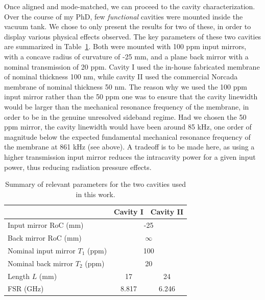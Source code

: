 Once aligned and mode-matched, we can proceed to the cavity characterization. Over the course of my PhD, few \textit{functional} cavities were mounted inside the vacuum tank. We chose to only present the results for two of these, in order to display various physical effects observed. The key parameters of these two cavities are summarized in Table~\ref{tab:mate_parameters}. Both were mounted with 100 ppm input mirrors, with a concave radius of curvature of -25 mm, and a plane back mirror with a nominal transmission of 20 ppm. Cavity I used the in-house fabricated membrane of nominal thickness 100 nm, while cavity II used the commercial Norcada membrane of nominal thickness 50 nm. The reason why we used the 100 ppm input mirror rather than the 50 ppm one was to ensure that the cavity linewidth would be larger than the mechanical resonance frequency of the membrane, in order to be in the genuine unresolved sideband regime. Had we chosen the 50 ppm mirror, the cavity linewidth would have been around 85 kHz, one order of magnitude below the expected fundamental mechanical resonance frequency of the membrane at 861 kHz (see above). A tradeoff is to be made here, as using a higher transmission input mirror reduces the intracavity power for a given input power, thus reducing radiation pressure effects. 

\begin{table}[h!]
    \centering
    \begin{tabular}{lcc}
         & Cavity I & Cavity II \\
        \hline
        Input mirror RoC (mm)        & \multicolumn{2}{c}{-25} \\
        Back mirror RoC (mm)         & \multicolumn{2}{c}{$\infty$} \\
        Nominal input mirror $T_1$ (ppm) & \multicolumn{2}{c}{100} \\
        Nominal back mirror $T_2$ (ppm)  & \multicolumn{2}{c}{20} \\
        Length $L$ (mm)               & 17 & 24 \\ 
        FSR (GHz)                  & 8.817 & 6.246  \\[0.6em]
        
    \end{tabular}
    \caption{Summary of relevant parameters for the two cavities used in this work.}
    \label{tab:mate_parameters}
\end{table}
 

